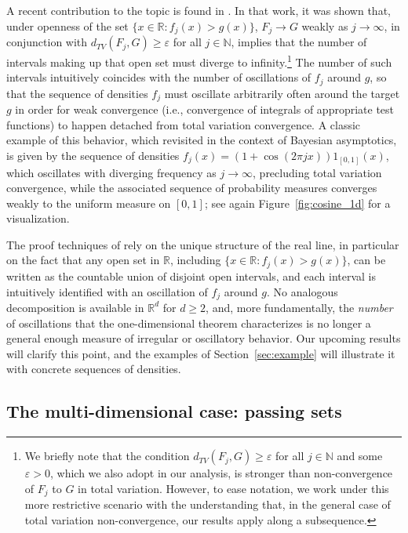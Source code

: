 \documentclass[12pt]{article}
\newcommand{\RR}{\mathbb{R}}
\newcommand{\NN}{\mathbb{N}}
\begin{document}
A recent contribution to the topic is found in \cite{bariletto2025identifiability}. In that work, it was shown that, under openness of the set
$\{x\in\RR : f_j(x)>g(x)\}$, $F_j\to G$ weakly as $j\to\infty$, in conjunction with $d_{TV}(F_j,G)\geq \varepsilon$
for all $j\in\NN$, implies that the number of intervals making up that open set must
diverge to infinity.\footnote{We briefly note that the condition $d_{TV}(F_j,G)\geq \varepsilon$
for all $j\in\NN$ and some $\varepsilon>0$, which we also adopt in our analysis, is stronger than non-convergence of $F_j$ to $G$ in total variation. However, to ease notation, we work under this more restrictive scenario with the understanding that, in the general case of total variation non-convergence, our results apply along a subsequence.} The number of such intervals intuitively coincides with the number of
oscillations of $f_j$ around $g$, so that the sequence of densities $f_j$ must oscillate
arbitrarily often around the target $g$ in order for weak convergence (i.e., convergence of
integrals of appropriate test functions) to happen detached from total variation convergence. A classic example of this behavior, which \cite{bariletto2025identifiability} revisited in the context of Bayesian asymptotics, is given by the sequence of densities $f_j(x)=(1+\cos(2\pi jx))1_{[0,1]}(x)$, which oscillates with diverging frequency as $j\to\infty$, precluding total variation convergence, while the associated sequence of probability measures converges weakly to the uniform measure on $[0,1]$; see again Figure~\ref{fig:cosine_1d} for a visualization.



The proof techniques of \cite{bariletto2025identifiability} rely on the unique structure of
the real line, in particular on the fact that any open set in $\RR$, including
$\{x\in\RR : f_j(x)>g(x)\}$, can be written as the countable union of disjoint open intervals, and each interval is intuitively identified with an oscillation of $f_j$ around $g$. No analogous
decomposition is available in $\RR^d$ for $d\geq 2$, and, more fundamentally, the \emph{number} of oscillations that
the one-dimensional theorem characterizes is no longer a general enough measure of irregular or oscillatory behavior. Our upcoming results will clarify this point, and the examples of Section~\ref{sec:example}
will illustrate it with concrete sequences of densities.

\subsection{The multi-dimensional case: passing sets}
\end{document}
